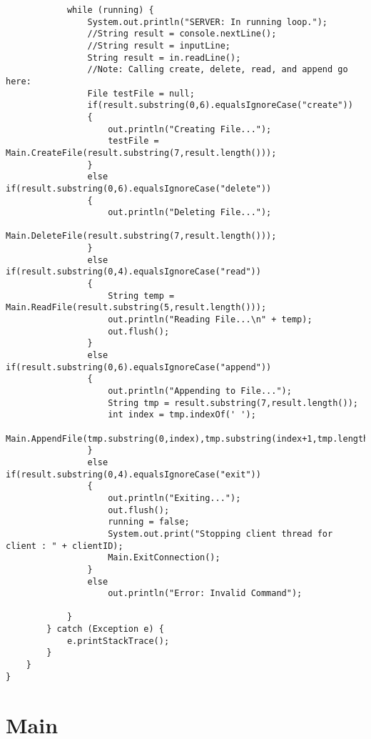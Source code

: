 \documentclass{article}
\begin{document}
\begin{lstlisting}
			while (running) {	
				System.out.println("SERVER: In running loop.");
				//String result = console.nextLine();
				//String result = inputLine;
				String result = in.readLine();
				//Note: Calling create, delete, read, and append go here:
				File testFile = null;
				if(result.substring(0,6).equalsIgnoreCase("create"))
				{
					out.println("Creating File...");
					testFile = Main.CreateFile(result.substring(7,result.length()));
				}
				else if(result.substring(0,6).equalsIgnoreCase("delete"))
				{
					out.println("Deleting File...");
					Main.DeleteFile(result.substring(7,result.length()));
				}
				else if(result.substring(0,4).equalsIgnoreCase("read"))
				{
					String temp = Main.ReadFile(result.substring(5,result.length()));
					out.println("Reading File...\n" + temp);
					out.flush();
				}
				else if(result.substring(0,6).equalsIgnoreCase("append"))
				{
					out.println("Appending to File...");
					String tmp = result.substring(7,result.length());
					int index = tmp.indexOf(' ');
					Main.AppendFile(tmp.substring(0,index),tmp.substring(index+1,tmp.length()));
				}
				else if(result.substring(0,4).equalsIgnoreCase("exit"))
				{
					out.println("Exiting...");
					out.flush();
					running = false;
					System.out.print("Stopping client thread for client : " + clientID);
					Main.ExitConnection();
				}
				else
					out.println("Error: Invalid Command");

			}
		} catch (Exception e) {
			e.printStackTrace();
		}
	}
}
		\end{lstlisting}
		
	\section{Main}
\end{document}
